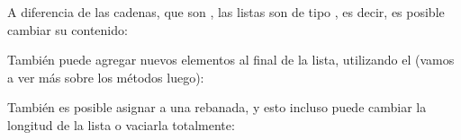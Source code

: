\documentclass[a5paper,10pt,spanish]{sphinxmanual}
\begin{document}
\sphinxAtStartPar
A diferencia de las cadenas, que son {\hyperref[\detokenize{glossary:term-immutable}]{}}, las listas son de tipo {\hyperref[\detokenize{glossary:term-mutable}]{}}, es decir, es posible cambiar su contenido:

\begin{sphinxVerbatim}[commandchars=\\\{\}]
  \PYG{p}{[}    \PYG{p}{]}  
    
\PYG{p}{[}\PYG{p}{]}    
\end{sphinxVerbatim}

\sphinxAtStartPar
También puede agregar nuevos elementos al final de la lista, utilizando el   (vamos a ver más sobre los métodos luego):

\begin{sphinxVerbatim}[commandchars=\\\{\}]
  
    
\end{sphinxVerbatim}

\sphinxAtStartPar
También es posible asignar a una rebanada, y esto incluso puede cambiar la longitud de la lista o vaciarla totalmente:
\end{document}

